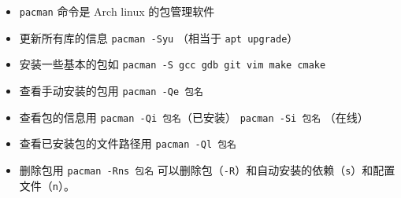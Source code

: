 
\begin{issues}
\issueDraft
\end{issues}

\begin{itemize}
\item \verb`pacman` 命令是 Arch linux 的包管理软件
\item 更新所有库的信息 \verb`pacman -Syu` （相当于 \verb`apt upgrade`）
\item 安装一些基本的包如 \verb`pacman -S gcc gdb git vim make cmake`
\item 查看手动安装的包用 \verb`pacman -Qe 包名`
\item 查看包的信息用 \verb`pacman -Qi 包名`（已安装） \verb`pacman -Si 包名` （在线）
\item 查看已安装包的文件路径用 \verb`pacman -Ql 包名`
\item 删除包用 \verb`pacman -Rns 包名` 可以删除包（\verb`-R`）和自动安装的依赖（\verb`s`）和配置文件（\verb`n`）。
\end{itemize}
